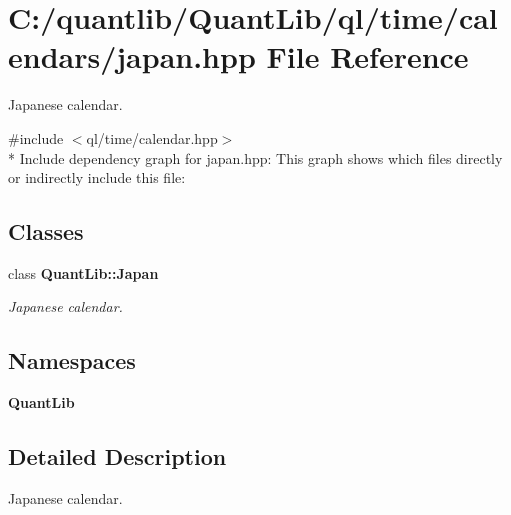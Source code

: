 \section{C\+:/quantlib/\+Quant\+Lib/ql/time/calendars/japan.hpp File Reference}
\label{japan_8hpp}


Japanese calendar.  


{\ttfamily \#include $<$ql/time/calendar.\+hpp$>$}\\*
Include dependency graph for japan.\+hpp\+:
This graph shows which files directly or indirectly include this file\+:
\subsection*{Classes}
\begin{DoxyCompactItemize}
\item 
class {\bf Quant\+Lib\+::\+Japan}
\begin{DoxyCompactList}\small\item\em Japanese calendar. \end{DoxyCompactList}\end{DoxyCompactItemize}
\subsection*{Namespaces}
\begin{DoxyCompactItemize}
\item 
 {\bf Quant\+Lib}
\end{DoxyCompactItemize}


\subsection{Detailed Description}
Japanese calendar. 

